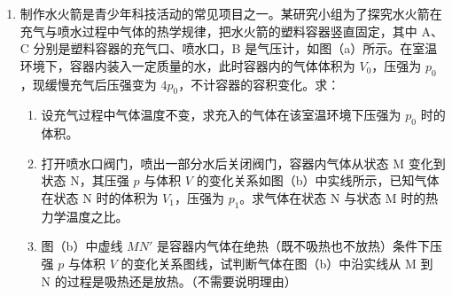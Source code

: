 \documentclass[\gkver]{gaokaozhenti}
\begin{document}
\begin{enumerate}
{$I_{g} = \frac{E}{R_{0} + R_{g}}$

$S_{1}$ 接 2 时，则有

$\frac{I_{g}}{2} = \frac{E}{R_{0} + R_{g} + R_{T}}$

联立解得 $R_{T} = R_{0} + R_{g} = 60 \UO + 240 \UO = 300 \UO$

（3）由图（c）可知，$R_{T} = 300 \UO$ 时，对应的温度约为 $9^{\circ}\mathrm{C}$。

（4）开关 $S_{1}$ 接 1，闭合 $S_{2}$，调节电阻箱，使电流表示数为 $I_{g}$。由并联电路的分流作用，结合 $R_{g} = 5R$，可得干路电流为 $6I_{g}$，则有并联部分的电阻

$R_{\text{并}} = \frac{R_{g}R}{R_{g} + R}$

由欧姆定律可得

$6I_{g} = \frac{E}{R_{\text{并}} + R_{0}'}$

结合 $I_{g} = \frac{E}{R_{0} + R_{g}}$，$R_{0} = 60 \UO$

解得 $R_{0}' = 10 \UO$

$S_{1}$ 接 2 时，电流表示数为 $\frac{I_{g}}{k}$（$k > 1$），同理可得干路电流可为 $\frac{6}{k}I_{g}$，由欧姆定律可得

$\frac{6}{k}I_{g} = \frac{E}{R_{\text{并}} + R_{0}' + R_{T}}$

结合 $6I_{g} = \frac{E}{R_{\text{并}} + R_{0}'}$

其中 $R_{\text{并}} = 40 \UO$

解得 $R_{T} = (k - 1)(R_{\text{并}} + R_{0}') = 50(k - 1) \UO$
}

\item
制作水火箭是青少年科技活动的常见项目之一。某研究小组为了探究水火箭在充气与喷水过程中气体的热学规律，把水火箭的塑料容器竖直固定，其中 A、C 分别是塑料容器的充气口、喷水口，B 是气压计，如图（a）所示。在室温环境下，容器内装入一定质量的水，此时容器内的气体体积为 $V_{0}$，压强为 $p_{0}$，现缓慢充气后压强变为 $4p_{0}$，不计容器的容积变化。求：
\begin{enumerate}
	\item
	设充气过程中气体温度不变，求充入的气体在该室温环境下压强为 $p_{0}$ 时的体积。
	\item
	打开喷水口阀门，喷出一部分水后关闭阀门，容器内气体从状态 M 变化到状态 N，其压强 $p$ 与体积 $V$ 的变化关系如图（b）中实线所示，已知气体在状态 N 时的体积为 $V_{1}$，压强为 $p_{1}$。求气体在状态 N 与状态 M 时的热力学温度之比。
	\item
	图（b）中虚线 $MN'$ 是容器内气体在绝热（既不吸热也不放热）条件下压强 $p$ 与体积 $V$ 的变化关系图线，试判断气体在图（b）中沿实线从 M 到 N 的过程是吸热还是放热。（不需要说明理由）
\end{enumerate}


\end{enumerate}
\end{document}
